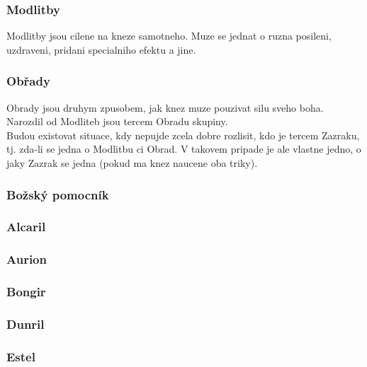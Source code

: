 \documentclass[../main.tex]{subfiles}
\begin{document}
\subsubsection*{Modlitby}
\label{sec:modlitby}
Modlitby jsou  cilene na kneze samotneho. Muze se jednat o ruzna posileni, uzdraveni, pridani specialniho efektu a jine. 

\subsubsection*{Obřady}
\label{sec:obrady}
Obrady jsou druhym zpusobem, jak knez muze pouzivat silu sveho boha. Narozdil od Modliteb jsou tercem Obradu skupiny.\\

Budou existovat situace, kdy nepujde zcela dobre rozlisit, kdo je tercem Zazraku, tj. zda-li se jedna o Modlitbu ci Obrad.  V takovem pripade je ale vlastne jedno, o jaky Zazrak se jedna (pokud ma knez naucene oba triky).

\subsubsection*{Božský pomocník}
\label{sec:bozsky-pomocnik}

\subsubsection{Alcaril}
\label{sec:alcaril}

\subsubsection{Aurion}
\label{sec:aurion}

\subsubsection{Bongir}
\label{sec:bongir}

\subsubsection{Dunril}
\label{sec:dunril}

\subsubsection{Estel}
\label{sec:estel}
\end{document}
